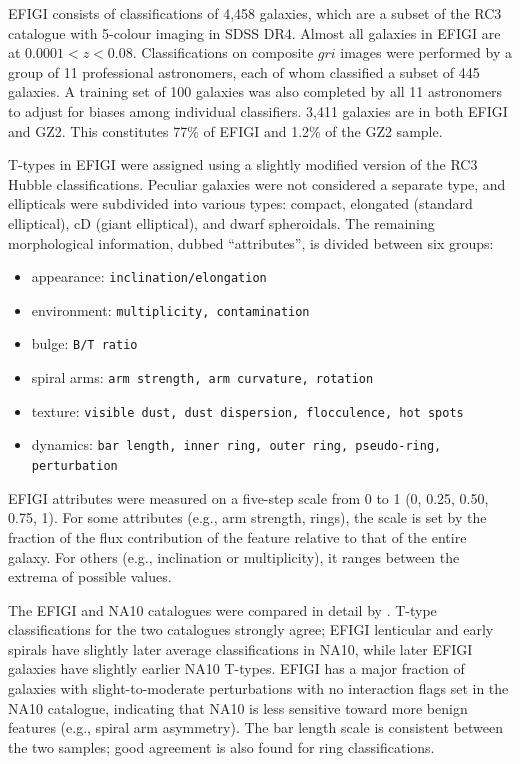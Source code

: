 \documentclass[useAMS,usenatbib]{mn2e}
\begin{document}
EFIGI consists of classifications of 4,458 galaxies, which are a subset of the RC3 catalogue with 5-colour imaging in SDSS DR4. Almost all galaxies in EFIGI are at $0.0001<z<0.08$. Classifications on composite $gri$ images were performed by a group of 11 professional astronomers, each of whom classified a subset of 445 galaxies. A training set of 100 galaxies was also completed by all 11 astronomers to adjust for biases among individual classifiers. 3,411 galaxies are in both EFIGI and GZ2. This constitutes 77\% of EFIGI and 1.2\% of the GZ2 sample. 

T-types in EFIGI were assigned using a slightly modified version of the RC3 Hubble classifications. Peculiar galaxies were not considered a separate type, and ellipticals were subdivided into various types: compact, elongated (standard elliptical), cD (giant elliptical), and dwarf spheroidals. The remaining morphological information, dubbed ``attributes'', is divided between six groups:

\begin{itemize}
	\item appearance: {\tt inclination/elongation }
	\item environment: {\tt multiplicity, contamination}
	\item bulge: {\tt B/T ratio}
	\item spiral arms: {\tt arm strength, arm curvature, rotation}
	\item texture: {\tt visible dust, dust dispersion, flocculence, hot spots}
	\item dynamics: {\tt bar length, inner ring, outer ring, pseudo-ring, perturbation}
\end{itemize}

\noindent EFIGI attributes were measured on a five-step scale from 0 to 1 (0, 0.25, 0.50, 0.75, 1). For some attributes (e.g., arm strength, rings), the scale is set by the fraction of the flux contribution of the feature relative to that of the entire galaxy. For others (e.g., inclination or multiplicity), it ranges between the extrema of possible values. %

The EFIGI and NA10 catalogues were compared in detail by \citet{bai11}. T-type classifications for the two catalogues strongly agree; EFIGI lenticular and early spirals have slightly later average classifications in NA10, while later EFIGI galaxies have slightly earlier NA10 T-types. EFIGI has a major fraction of galaxies with slight-to-moderate perturbations with no interaction flags set in the NA10 catalogue, indicating that NA10 is less sensitive toward more benign features (e.g., spiral arm asymmetry). The bar length scale is consistent between the two samples; good agreement is also found for ring classifications. 
\end{document}
